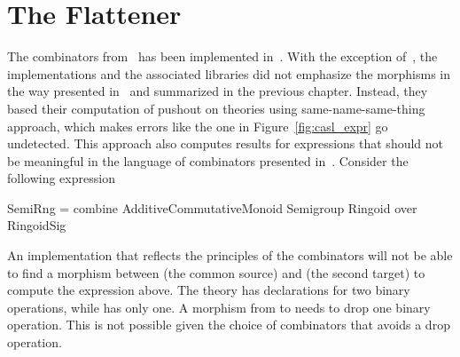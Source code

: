 \chapter{The Flattener}
\label{sec:lib_implementation}


The combinators from~\cite{carette2018building} has been implemented in~\cite{cicm2019diagrams, TPCProto, meta-prim-blog}. With the exception of~\cite{cicm2019diagrams}, the implementations and the associated libraries did not emphasize the morphisms in the way presented in~\cite{carette2018building} and summarized in the previous chapter. Instead, they based their computation of pushout on theories using same-name-same-thing approach, which makes errors like the one in Figure~\ref{fig:casl_expr} go undetected.  
This approach also computes results for expressions that should not be meaningful in the language of combinators presented in~\cite{carette2018building}. Consider the following expression
\begin{togcode}
SemiRng = combine AdditiveCommutativeMonoid Semigroup Ringoid
          over RingoidSig
\end{togcode}

An implementation that reflects the principles of the combinators will not be able to find a morphism between  (the common source) and  (the second target) to compute the expression above. 
The theory  has declarations for two binary operations, while  has only one. A morphism from  to  needs to drop one binary operation. This is not possible given the choice of combinators that avoids a drop operation. 

